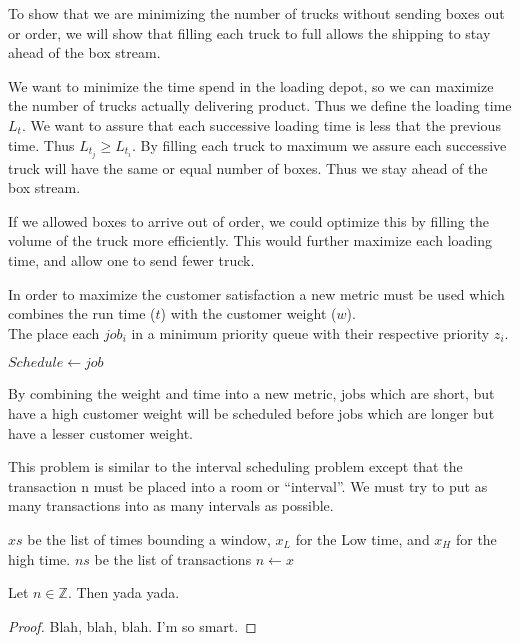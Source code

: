 \documentclass[12pt]{article}
\newcommand{\Z}{\mathbb{Z}}
\newenvironment{problem}[2][Problem]{\begin{trivlist}
\item[\hskip \labelsep {\bfseries #1}\hskip \labelsep {\bfseries #2.}]}{\end{trivlist}}
\begin{document}
\begin{problem}{4.3}
    To show that we are minimizing the number of trucks without sending boxes
    out or order, we will show that filling each truck to full allows the
    shipping to stay ahead of the box stream. 

    We want to minimize the time spend in the loading depot, so we can maximize
    the number of trucks actually delivering product. Thus we define the loading
    time $L_t$. We want to assure that each successive loading time is less that
    the previous time. Thus $L_t_j \geq L_t_i$.  By filling each truck to
    maximum we assure each successive truck will have the same or equal number
    of boxes. Thus we stay ahead of the box stream. 
    
    If we allowed boxes to arrive out of order, we could optimize this by
    filling the volume of the truck more efficiently. This would further
    maximize each loading time, and allow one to send fewer truck.
\end{problem}
\begin{problem}{4.13} 
In order to maximize the customer satisfaction a new metric must be used which
combines the run time ($t$) with the customer weight ($w$).
\begin{equation}
\end{equation}
The place each $job_i$ in a minimum priority queue with their respective priority
$z_i$.
\begin{algorithmic}
        \State $Schedule \gets job$
    \EndFor
\end{algorithmic}

By combining the weight and time into a new metric, jobs which are short, but
have a high customer weight will be scheduled before jobs which are longer but
have a lesser customer weight.
\end{problem}
 
\begin{problem}{4.16}
    This problem is similar to the interval scheduling problem except that the
    transaction n must be placed into a room or ``interval''. We must try to put
    as many transactions into as many intervals as possible.
    \begin{algorithmic}
        \Require $xs$ be the list of times bounding a window, $x_L$ for the Low time, and
        $x_H$ for the high time. 
        \Require $ns$ be the list of transactions 
                    \State $n \gets x$ 
                \EndIf
            \EndFor
        \EndFor
\end{algorithmic}
Let $n\in \Z$.  Then yada yada.
\end{problem}
 
\begin{proof}
Blah, blah, blah.  I'm so smart.
\end{proof}
 
 
\end{document}
